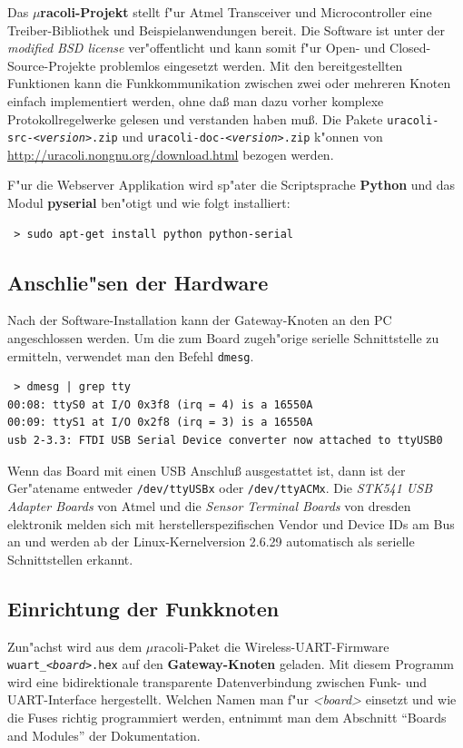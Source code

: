 \documentclass{clt2011}
\begin{document}
Das {\bf $\mu{}$racoli-Projekt} stellt f"ur \textsf{Atmel} Transceiver und Microcontroller
eine Treiber-Bibliothek und Beispielanwendungen bereit. Die Software ist unter der
{\em modified BSD license} ver"offentlicht und kann somit f"ur Open- und Closed-Source-Projekte
problemlos eingesetzt werden.
Mit den bereitgestellten Funktionen kann die Funkkommunikation zwischen zwei
oder mehreren Knoten einfach implementiert werden, ohne da\ss{} man dazu vorher komplexe
Protokollregelwerke gelesen und verstanden haben mu\ss{}.
Die Pakete {\tt uracoli-src-{\em<version>}.zip} und {\tt uracoli-doc-{\em<version>}.zip} k"onnen
von \url{http://uracoli.nongnu.org/download.html} bezogen werden.

F"ur die Webserver Applikation wird sp"ater die Scriptsprache
{\bf Python} und das Modul {\bf pyserial} ben"otigt und wie folgt installiert:
\begin{lstlisting}
 > sudo apt-get install python python-serial
\end{lstlisting}

\subsection*{Anschlie"sen der Hardware}
Nach der Software-Installation kann der Gateway-Knoten an den PC
angeschlossen werden. Um die zum Board zugeh"orige serielle Schnittstelle zu
ermitteln, verwendet man den Befehl {\tt dmesg}.

\begin{lstlisting}
 > dmesg | grep tty
00:08: ttyS0 at I/O 0x3f8 (irq = 4) is a 16550A
00:09: ttyS1 at I/O 0x2f8 (irq = 3) is a 16550A
usb 2-3.3: FTDI USB Serial Device converter now attached to ttyUSB0
\end{lstlisting}

Wenn das Board mit einen USB Anschlu\ss{} ausgestattet ist, dann ist der
Ger"atename entweder {\tt /dev/ttyUSBx} oder {\tt /dev/ttyACMx}.
Die {\em STK541 USB Adapter Boards} von \textsf{Atmel} und die {\em Sensor Terminal Boards}
von \textsf{dresden elektronik} melden sich mit herstellerspezifischen Vendor und Device IDs
am Bus an und werden ab der Linux-Kernelversion 2.6.29 automatisch als
serielle Schnittstellen erkannt.

\subsection*{Einrichtung der Funkknoten}
Zun"achst wird aus dem $\mu$racoli-Paket
die Wireless-UART-Firmware {\tt wuart\_{\em<board>}.hex} auf den {\bf Gateway-Knoten} geladen. Mit diesem
Programm wird eine bidirektionale transparente Datenverbindung zwischen Funk- und UART-Interface
hergestellt. Welchen Namen man f"ur {\em<board>} einsetzt und wie die Fuses richtig programmiert
werden, entnimmt man dem Abschnitt "`Boards and Modules"' der Dokumentation.
\end{document}
